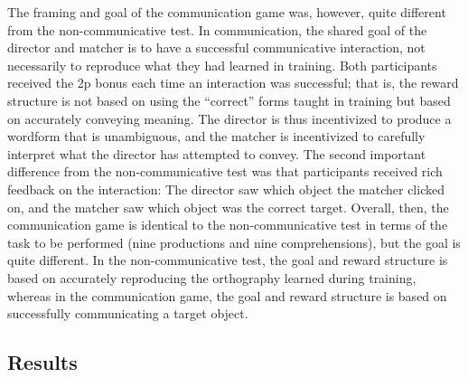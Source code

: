 \documentclass[doc,biblatex]{apa7}
\begin{document}
The framing and goal of the communication game was, however, quite different from the non-communicative test. In communication, the shared goal of the director and matcher is to have a successful communicative interaction, not necessarily to reproduce what they had learned in training. Both participants received the 2p bonus each time an interaction was successful; that is, the reward structure is not based on using the ``correct'' forms taught in training but based on accurately conveying meaning. The director is thus incentivized to produce a wordform that is unambiguous, and the matcher is incentivized to carefully interpret what the director has attempted to convey. The second important difference from the non-communicative test was that participants received rich feedback on the interaction: The director saw which object the matcher clicked on, and the matcher saw which object was the correct target. Overall, then, the communication game is identical to the non-communicative test in terms of the task to be performed (nine productions and nine comprehensions), but the goal is quite different. In the non-communicative test, the goal and reward structure is based on accurately reproducing the orthography learned during training, whereas in the communication game, the goal and reward structure is based on successfully communicating a target object.

\subsection{Results}
\end{document}
